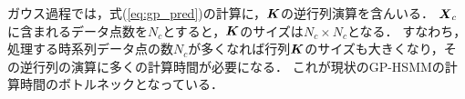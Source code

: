 \documentclass[conference]{IEEEtran}
\begin{document}
ガウス過程では，式(\ref{eq:gp_pred})の計算に，${ \boldsymbol K}$の逆行列演算を含んいる．
${ \boldsymbol X}_c$に含まれるデータ点数を$N_c$とすると，${ \boldsymbol K}$のサイズは$N_c \times N_c$となる．
すなわち，処理する時系列データ点の数$N_c$が多くなれば行列${ \boldsymbol K}$のサイズも大きくなり，その逆行列の演算に多くの計算時間が必要になる．
これが現状のGP-HSMMの計算時間のボトルネックとなっている．

\end{document}
